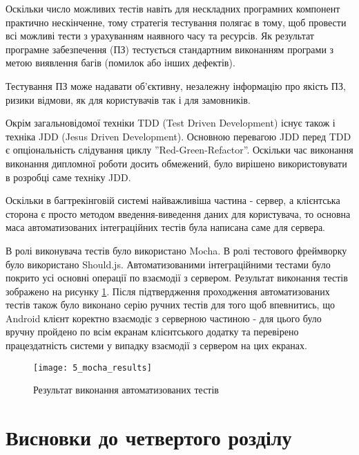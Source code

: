 \documentclass[../main.tex]{subfiles}
\begin{document}
Оскільки число можливих тестів навіть для нескладних програмних компонент практично нескінченне, тому стратегія тестування полягає в тому, щоб провести всі можливі тести з урахуванням наявного часу та ресурсів. Як результат програмне забезпечення (ПЗ) тестується стандартним виконанням програми з метою виявлення багів (помилок або інших дефектів).

Тестування ПЗ може надавати об'єктивну, незалежну інформацію про якість ПЗ, ризики відмови, як для користувачів так і для замовників.\cite{agile_testing}

Окрім загальновідомої техніки TDD (Test Driven Development) існує також і техніка JDD (Jesus Driven Development).\cite{jdd} Основною перевагою JDD перед TDD є опціональність слідування циклу ''Red-Green-Refactor''. Оскільки час виконання виконання дипломної роботи досить обмежений, було вирішено використовувати в розробці саме техніку JDD.

Оскільки в багтрекінговій системі найважливіша частина - сервер, а клієнтська сторона є просто методом введення-виведення даних для користувача, то основна маса автоматизованих інтеграційних тестів була написана саме для сервера.

В ролі виконувача тестів було використано Mocha. В ролі тестового фреймворку було використано Should.js. Автоматизованими інтеграційними тестами було покрито усі основні операції по взаємодії з сервером. Результат виконання тестів зображено на рисунку \ref{test_results}. Після підтвердження проходження автоматизованих тестів також було виконано серію ручних тестів для того щоб впевнитись, що Android клієнт коректно взаємодіє з серверною частиною - для цього було вручну пройдено по всім екранам клієнтського додатку та перевірено працездатність системи у випадку взаємодії з сервером на цих екранах.

\begin{figure}[H]
	\centering
	\texttt{[image: 5\_mocha\_results]}
	\caption{Результат виконання автоматизованих тестів}
	\label{test_results}
\end{figure}

\section{Висновки до четвертого розділу}
\end{document}
